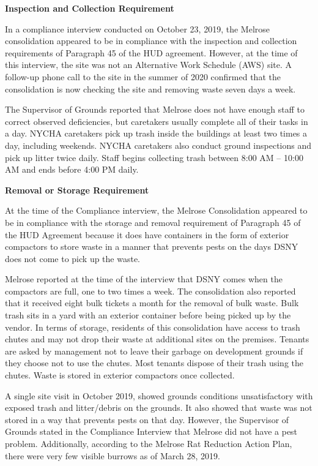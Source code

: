 
\textbf{Inspection and Collection Requirement}

In a compliance interview conducted on October 23, 2019, the Melrose consolidation appeared to be in compliance with the inspection and collection requirements of Paragraph 45 of the HUD agreement. However, at the time of this interview, the site was not an Alternative Work Schedule (AWS) site. A follow-up phone call to the site in the summer of 2020 confirmed that the consolidation is now checking the site and removing waste seven days a week.

The Supervisor of Grounds reported that Melrose does not have enough staff to correct observed deficiencies, but caretakers usually complete all of their tasks in a day. NYCHA caretakers pick up trash inside the buildings at least two times a day, including weekends. NYCHA caretakers also conduct ground inspections and pick up litter twice daily. Staff begins collecting trash between 8:00 AM -- 10:00 AM and ends before 4:00 PM daily.

\textbf{Removal or Storage Requirement}

At the time of the Compliance interview, the Melrose Consolidation appeared to be in compliance with the storage and removal requirement of Paragraph 45 of the HUD Agreement because it does have containers in the form of exterior compactors to store waste in a manner that prevents pests on the days DSNY does not come to pick up the waste.

Melrose reported at the time of the interview that DSNY comes when the compactors are full, one to two times a week. The consolidation also reported that it received eight bulk tickets a month for the removal of bulk waste. Bulk trash sits in a yard with an exterior container before being picked up by the vendor. In terms of storage, residents of this consolidation have access to trash chutes and may not drop their waste at additional sites on the premises. Tenants are asked by management not to leave their garbage on development grounds if they choose not to use the chutes. Most tenants dispose of their trash using the chutes. Waste is stored in exterior compactors once collected.

A single site visit in October 2019, showed grounds conditions unsatisfactory with exposed trash and litter/debris on the grounds. It also showed that waste was not stored in a way that prevents pests on that day. However, the Supervisor of Grounds stated in the Compliance Interview that Melrose did not have a pest problem. Additionally, according to the  Melrose Rat Reduction Action Plan, there were very few visible burrows as of March 28, 2019.

